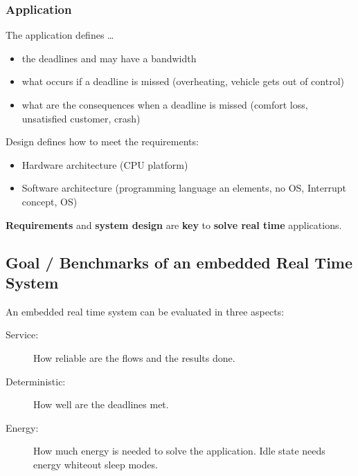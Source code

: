 \subsubsection{Application}
The application defines \ldots
\begin{itemize}[label=\ldots]
  \item the deadlines and may have a bandwidth
  \item what occurs if a deadline is missed (overheating, vehicle gets out of control)
  \item what are the consequences when a deadline is missed (comfort loss, unsatisfied customer, crash)

\end{itemize}
Design defines how to meet the requirements:
\begin{itemize}
  \item Hardware architecture (CPU platform)
  \item Software architecture (programming language an elements, no OS, Interrupt concept, OS)
\end{itemize}
\textbf{Requirements} and \textbf{system design} are \textbf{key} to \textbf{solve real time} applications.

\subsection{Goal / Benchmarks of an embedded Real Time System}
An embedded real time system can be evaluated in three aspects:
\begin{description}
  \item [Service:] How reliable are the flows and the results done.
  \item [Deterministic:] How well are the deadlines met.
  \item [Energy:] How much energy is needed to solve the application.
        Idle state needs energy whiteout sleep modes.
\end{description}

